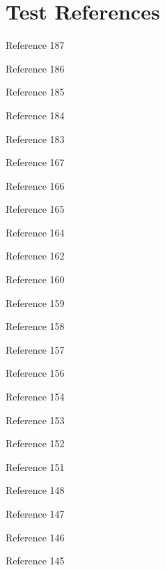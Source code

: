 \chapter{Test References}
Reference 187 \parencite{RefWorks:RefID:187-susskind1986expert} \par
Reference 186 \parencite{RefWorks:RefID:186-navarro2014deontic} \par
Reference 185 \parencite{RefWorks:RefID:185-2019transformerxl} \par
Reference 184 \parencite{RefWorks:RefID:184-zaheerbig} \par
Reference 183 \parencite{RefWorks:RefID:183-beltagylongformer} \par
Reference 167 \parencite{RefWorks:RefID:167-gardazi2025bert} \par
Reference 166 \parencite{RefWorks:RefID:166-mochales2009argumentation} \par
Reference 165 \parencite{RefWorks:RefID:165-bhattacharya2019comparative} \par
Reference 164 \parencite{RefWorks:RefID:164-aletras2016predicting} \par
Reference 162 \parencite{RefWorks:RefID:162-lairgi2024knowledge} \par
Reference 160 \parencite{RefWorks:RefID:160-xu2024large} \par
Reference 159 \parencite{RefWorks:RefID:159-ashley2017artificial} \par
Reference 158 \parencite{RefWorks:RefID:158-lewis2020retrievalaugmented} \par
Reference 157 \parencite{RefWorks:RefID:157-2017reading} \par
Reference 156 \parencite{RefWorks:RefID:156-gambhir2017recent} \par
Reference 154 \parencite{RefWorks:RefID:154-knublauch2017shapes} \par
Reference 153 \parencite{RefWorks:RefID:153-omran2020shacl} \par
Reference 152 \parencite{RefWorks:RefID:152-rabbani2022shacl} \par
Reference 151 \parencite{RefWorks:RefID:151-rabbani2023extraction} \par
Reference 148 \parencite{RefWorks:RefID:148-reiter1978on} \par
Reference 147 \parencite{RefWorks:RefID:147-bosco2024leading} \par
Reference 146 \parencite{RefWorks:RefID:146-sanders2024municipal} \par
Reference 145 \parencite{RefWorks:RefID:145-rau2024municipal} \par
